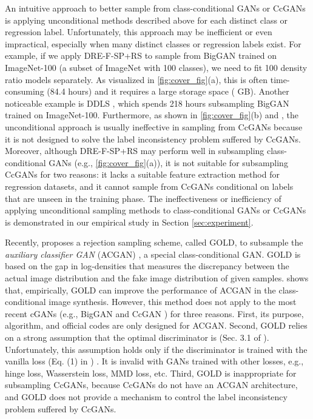 \documentclass[final,12pt, 3p,times]{elsarticle}
\begin{document}
An intuitive approach to better sample from class-conditional GANs or CcGANs is applying unconditional methods described above for each distinct class or regression label. Unfortunately, this approach may be inefficient or even impractical, especially when many distinct classes or regression labels exist. For example, if we apply DRE-F-SP+RS \cite{ding2020subsampling} to sample from BigGAN \cite{brock2018large} trained on ImageNet-100 \cite{cao2017hashnet} (a subset of ImageNet \cite{imagenet_cvpr09} with 100 classes), we need to fit 100 density ratio models separately. As visualized in \cref{fig:cover_fig}(a), this is often time-consuming (84.4 hours) and it requires a large storage space ( GB). Another noticeable example is DDLS \cite{che2020your}, which spends 218 hours subsampling BigGAN trained on ImageNet-100. Furthermore, as shown in \cref{fig:cover_fig}(b) and , the unconditional approach is usually ineffective in sampling from CcGANs because it is not designed to solve the label inconsistency problem suffered by CcGANs. Moreover, although DRE-F-SP+RS may perform well in subsampling class-conditional GANs (e.g., \cref{fig:cover_fig}(a)), it is not suitable for subsampling CcGANs for two reasons: it lacks a suitable feature extraction method for regression datasets, and it cannot sample from CcGANs conditional on labels that are unseen in the training phase. The ineffectiveness or inefficiency of applying unconditional sampling methods to class-conditional GANs or CcGANs is demonstrated in our empirical study in Section \ref{sec:experiment}.

Recently, \cite{mo2019mining} proposes a rejection sampling scheme, called GOLD, to subsample the \textit{auxiliary classifier GAN} (ACGAN) \cite{odena2017conditional}, a special class-conditional GAN. GOLD is based on the gap in log-densities that measures the discrepancy between the actual image distribution and the fake image distribution of given samples. \cite{mo2019mining} shows that, empirically, GOLD can improve the performance of ACGAN in the class-conditional image synthesis. However, this method does not apply to the most recent cGANs (e.g., BigGAN \cite{brock2018large} and CcGAN \cite{ding2021ccgan, ding2020continuous}) for three reasons. First, its purpose, algorithm, and official codes are only designed for ACGAN. Second, GOLD relies on a strong assumption that the optimal discriminator is  (Sec. 3.1 of \cite{mo2019mining}). Unfortunately, this assumption holds only if the discriminator is trained with the vanilla loss (Eq. (1) in \cite{goodfellow2014generative}) \cite{azadi2018discriminator, goodfellow2014generative}. It is invalid with GANs trained with other losses, e.g., hinge loss, Wasserstein loss, MMD loss, etc. Third, GOLD is inappropriate for subsampling CcGANs, because CcGANs do not have an ACGAN architecture, and GOLD does not provide a mechanism to control the label inconsistency problem suffered by CcGANs.
\end{document}
